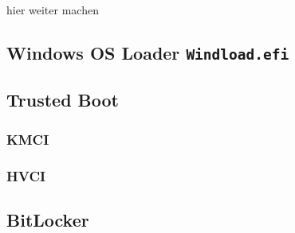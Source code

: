 hier weiter machen
\cite[12. Measured Boot]{windows-internals-7-part2}

\subsection{Windows OS Loader \lstinline{Windload.efi}}




\subsection{Trusted Boot}
\subsubsection{KMCI}
\subsubsection{HVCI}
\subsection{BitLocker}


